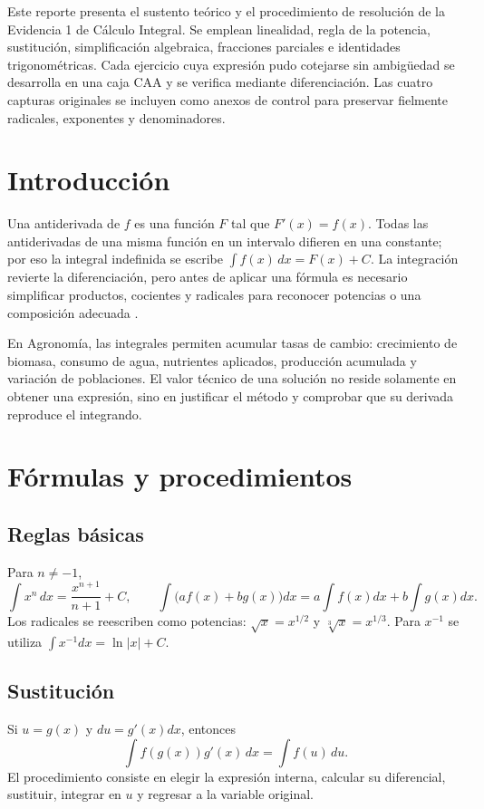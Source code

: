 \begin{abstractd}
Este reporte presenta el sustento teórico y el procedimiento de resolución de la Evidencia 1 de Cálculo Integral. Se emplean linealidad, regla de la potencia, sustitución, simplificación algebraica, fracciones parciales e identidades trigonométricas. Cada ejercicio cuya expresión pudo cotejarse sin ambigüedad se desarrolla en una caja CAA y se verifica mediante diferenciación. Las cuatro capturas originales se incluyen como anexos de control para preservar fielmente radicales, exponentes y denominadores.
\end{abstractd}

\templateIndex

\section{Introducción}
Una antiderivada de $f$ es una función $F$ tal que $F'(x)=f(x)$. Todas las antiderivadas de una misma función en un intervalo difieren en una constante; por eso la integral indefinida se escribe $\int f(x)\,dx=F(x)+C$. La integración revierte la diferenciación, pero antes de aplicar una fórmula es necesario simplificar productos, cocientes y radicales para reconocer potencias o una composición adecuada \citep{stewart2016calculus,openstax2016calculus1}.

En Agronomía, las integrales permiten acumular tasas de cambio: crecimiento de biomasa, consumo de agua, nutrientes aplicados, producción acumulada y variación de poblaciones. El valor técnico de una solución no reside solamente en obtener una expresión, sino en justificar el método y comprobar que su derivada reproduce el integrando.

\section{Fórmulas y procedimientos}
\subsection{Reglas básicas}
Para $n\neq-1$,
\[
 \int x^n\,dx=\frac{x^{n+1}}{n+1}+C,\qquad
 \int\!\bigl(af(x)+bg(x)\bigr)dx=a\int f(x)dx+b\int g(x)dx.
\]
Los radicales se reescriben como potencias: $\sqrt{x}=x^{1/2}$ y $\sqrt[3]{x}=x^{1/3}$. Para $x^{-1}$ se utiliza $\int x^{-1}dx=\ln|x|+C$.

\subsection{Sustitución}
Si $u=g(x)$ y $du=g'(x)dx$, entonces
\[
 \int f(g(x))g'(x)\,dx=\int f(u)\,du.
\]
El procedimiento consiste en elegir la expresión interna, calcular su diferencial, sustituir, integrar en $u$ y regresar a la variable original.

